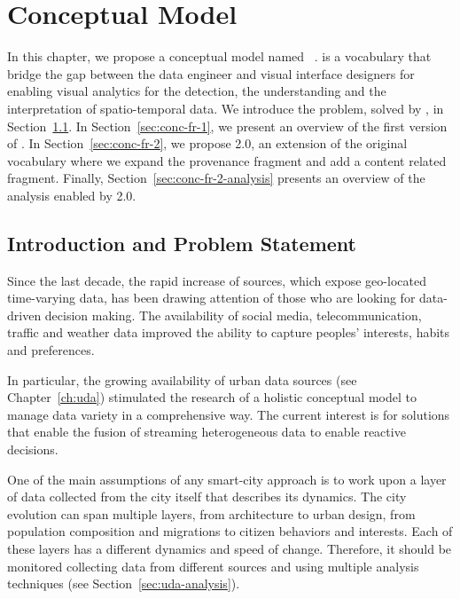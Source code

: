 \chapter{Conceptual Model}\label{ch:conceptual}

In this chapter, we propose a conceptual model named \frappe{}~\cite{DBLP:conf/semweb/BalduiniV15}. \frappe{} is a vocabulary that bridge the gap between the data engineer and visual interface designers for enabling visual analytics for the detection, the understanding and the interpretation of spatio-temporal data.
We introduce the problem, solved by \frappe{}, in Section~\ref{sec:conc-intro}.
In Section~\ref{sec:conc-fr-1}, we present an overview of the first version of \frappe{}.
In Section~\ref{sec:conc-fr-2}, we propose \frappe{} 2.0, an extension of the original vocabulary where we expand the provenance fragment and add a content related fragment.
Finally, Section~\ref{sec:conc-fr-2-analysis} presents an overview of the analysis enabled by \frappe{} 2.0.

\section{Introduction and Problem Statement}\label{sec:conc-intro}
Since the last decade, the rapid increase of sources, which expose geo-located time-varying data, has been drawing attention of those who are looking for data-driven decision making. 
The availability of social media, telecommunication, traffic and weather data improved the ability to capture peoples' interests, habits and preferences.

In particular, the growing availability of urban data sources (see Chapter~\ref{ch:uda}) stimulated the research of a holistic conceptual model to manage data variety in a comprehensive way. The current interest is for solutions that enable the fusion of streaming heterogeneous data to enable reactive decisions.

One of the main assumptions of any smart-city approach is to work upon a layer of data collected from the city itself that describes its dynamics. The city evolution can span multiple layers, from architecture to urban design, from population composition and migrations to citizen behaviors and interests. Each of these layers has a different dynamics and speed of change.
Therefore, it should be monitored collecting data from different sources and using multiple analysis techniques (see Section~\ref{sec:uda-analysis}). 

